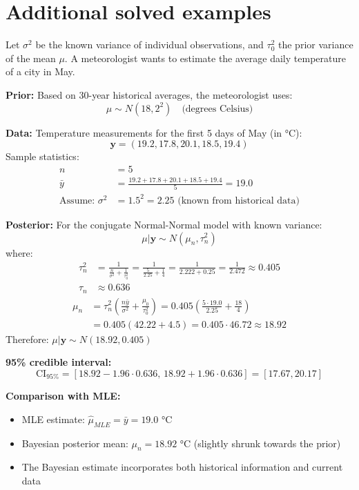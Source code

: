\section{Additional solved examples}
\begin{examplebox}
\begin{example}
Let \(\sigma^2\) be the known variance of individual observations, and \(\tau_0^2\) the prior variance of the mean \(\mu\).
A meteorologist wants to estimate the average daily temperature of a city in May.

\textbf{Prior:}
Based on 30-year historical averages, the meteorologist uses:
$$\mu \sim N(18, 2^2) \quad \text{(degrees Celsius)}$$

\textbf{Data:}
Temperature measurements for the first 5 days of May (in °C):
$$\mathbf{y} = (19.2, 17.8, 20.1, 18.5, 19.4)$$
Sample statistics:
\begin{align*}
n &= 5 \\
\bar{y} &= \frac{19.2 + 17.8 + 20.1 + 18.5 + 19.4}{5} = 19.0 \\
\text{Assume: } \sigma^2 &= 1.5^2 = 2.25 \text{ (known from historical data)}
\end{align*}

\textbf{Posterior:}
For the conjugate Normal-Normal model with known variance:
$$\mu|\mathbf{y} \sim N(\mu_n, \tau_n^2)$$
where:
\begin{align*}
\tau_n^2 &= \frac{1}{\frac{n}{\sigma^2} + \frac{1}{\tau_0^2}} = \frac{1}{\frac{5}{2.25} + \frac{1}{4}} = \frac{1}{2.222 + 0.25} = \frac{1}{2.472} \approx 0.405 \\
\tau_n &\approx 0.636
\end{align*}
\begin{align*}
\mu_n &= \tau_n^2 \left(\frac{n\bar{y}}{\sigma^2} + \frac{\mu_0}{\tau_0^2}\right) = 0.405 \left(\frac{5 \cdot 19.0}{2.25} + \frac{18}{4}\right) \\
&= 0.405(42.22 + 4.5) = 0.405 \cdot 46.72 \approx 18.92
\end{align*}
Therefore: $\mu|\mathbf{y} \sim N(18.92, 0.405)$

\textbf{95\% credible interval:}
$$\text{CI}_{95\%} = [18.92 - 1.96 \cdot 0.636, \, 18.92 + 1.96 \cdot 0.636] = [17.67, 20.17]$$

\textbf{Comparison with MLE:}
\begin{itemize}
\item MLE estimate: $\hat{\mu}_{MLE} = \bar{y} = 19.0$ °C
\item Bayesian posterior mean: $\mu_n = 18.92$ °C (slightly shrunk towards the prior)
\item The Bayesian estimate incorporates both historical information and current data
\end{itemize}


\end{example}
\end{examplebox}
